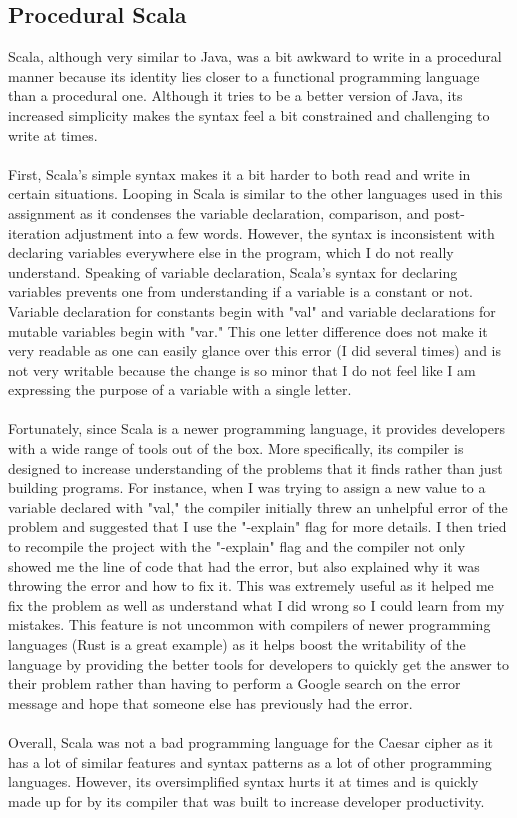 \documentclass[letterpaper, 10pt, DIV=13]{scrartcl}
\numberwithin{equation}{section}
\numberwithin{figure}{section}
\numberwithin{table}{section}
\begin{document}
\subsection{Procedural Scala}
Scala, although very similar to Java, was a bit awkward to write in a procedural manner because its identity lies closer to a functional programming language than a procedural one. Although it tries to be a better version of Java, its increased simplicity makes the syntax feel a bit constrained and challenging to write at times.
\\ \\
First, Scala's simple syntax makes it a bit harder to both read and write in certain situations. Looping in Scala is similar to the other languages used in this assignment as it condenses the variable declaration, comparison, and post-iteration adjustment into a few words. However, the syntax is inconsistent with declaring variables everywhere else in the program, which I do not really understand. Speaking of variable declaration, Scala's syntax for declaring variables prevents one from understanding if a variable is a constant or not. Variable declaration for constants begin with "val" and variable declarations for mutable variables begin with "var." This one letter difference does not make it very readable as one can easily glance over this error (I did several times) and is not very writable because the change is so minor that I do not feel like I am expressing the purpose of a variable with a single letter.
\\ \\
Fortunately, since Scala is a newer programming language, it provides developers with a wide range of tools out of the box. More specifically, its compiler is designed to increase understanding of the problems that it finds rather than just building programs. For instance, when I was trying to assign a new value to a variable declared with "val," the compiler initially threw an unhelpful error of the problem and suggested that I use the "-explain" flag for more details. I then tried to recompile the project with the "-explain" flag and the compiler not only showed me the line of code that had the error, but also explained why it was throwing the error and how to fix it. This was extremely useful as it helped me fix the problem as well as understand what I did wrong so I could learn from my mistakes. This feature is not uncommon with compilers of newer programming languages (Rust is a great example) as it helps boost the writability of the language by providing the better tools for developers to quickly get the answer to their problem rather than having to perform a Google search on the error message and hope that someone else has previously had the error.
\\ \\
Overall, Scala was not a bad programming language for the Caesar cipher as it has a lot of similar features and syntax patterns as a lot of other programming languages. However, its oversimplified syntax hurts it at times and is quickly made up for by its compiler that was built to increase developer productivity.
\end{document}
